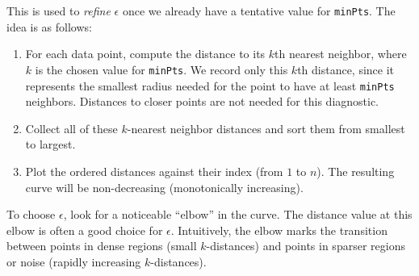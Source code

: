 This is used to \textit{refine} $\epsilon$ once we already have a tentative value for \texttt{minPts}. The idea is as follows:

\begin{enumerate}
    \item For each data point, compute the distance to its $k$th nearest neighbor, where $k$ is the chosen value for \texttt{minPts}. We record only this $k$th distance, since it represents the smallest radius needed for the point to have at least \texttt{minPts} neighbors. Distances to closer points are not needed for this diagnostic.

    \item Collect all of these $k$-nearest neighbor distances and sort them from smallest to largest.
    
    \item Plot the ordered distances against their index (from $1$ to $n$). The resulting curve will be non-decreasing (monotonically increasing).
\end{enumerate}

\medskip

To choose $\epsilon$, look for a noticeable ``elbow'' in the curve. The distance value at this elbow is often a good choice for $\epsilon$. Intuitively, the elbow marks the transition between points in dense regions (small $k$-distances) and points in sparser regions or noise (rapidly increasing $k$-distances).

